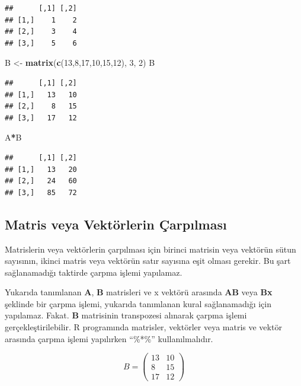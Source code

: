 \documentclass[
]{book}
\newenvironment{Shaded}{\begin{snugshade}}{\end{snugshade}}
\newcommand{\DecValTok}[1]{\textcolor[rgb]{0.00,0.00,0.81}{#1}}
\newcommand{\FunctionTok}[1]{\textcolor[rgb]{0.13,0.29,0.53}{\textbf{#1}}}
\newcommand{\NormalTok}[1]{#1}
\newcommand{\OtherTok}[1]{\textcolor[rgb]{0.56,0.35,0.01}{#1}}
\newcommand{\SpecialCharTok}[1]{\textcolor[rgb]{0.81,0.36,0.00}{\textbf{#1}}}
\begin{document}
\begin{verbatim}
##      [,1] [,2]
## [1,]    1    2
## [2,]    3    4
## [3,]    5    6
\end{verbatim}

\begin{Shaded}
\begin{Highlighting}[]
\NormalTok{ B }\OtherTok{\textless{}{-}} \FunctionTok{matrix}\NormalTok{(}\FunctionTok{c}\NormalTok{(}\DecValTok{13}\NormalTok{,}\DecValTok{8}\NormalTok{,}\DecValTok{17}\NormalTok{,}\DecValTok{10}\NormalTok{,}\DecValTok{15}\NormalTok{,}\DecValTok{12}\NormalTok{), }\DecValTok{3}\NormalTok{, }\DecValTok{2}\NormalTok{) }
\NormalTok{ B }
\end{Highlighting}
\end{Shaded}

\begin{verbatim}
##      [,1] [,2]
## [1,]   13   10
## [2,]    8   15
## [3,]   17   12
\end{verbatim}

\begin{Shaded}
\begin{Highlighting}[]
\NormalTok{ A}\SpecialCharTok{*}\NormalTok{B }
\end{Highlighting}
\end{Shaded}

\begin{verbatim}
##      [,1] [,2]
## [1,]   13   20
## [2,]   24   60
## [3,]   85   72
\end{verbatim}

\subsection{Matris veya Vektörlerin Çarpılması}\label{matris-veya-vektuxf6rlerin-uxe7arpux131lmasux131}

Matrislerin veya vektörlerin çarpılması için birinci matrisin veya vektörün sütun sayısının, ikinci matris veya vektörün satır sayısına eşit olması gerekir. Bu şart sağlanamadığı taktirde çarpma işlemi yapılamaz.

Yukarıda tanımlanan \textbf{A}, \textbf{B} matrisleri ve x vektörü arasında \textbf{AB} veya \textbf{Bx} şeklinde bir çarpma işlemi, yukarıda tanımlanan kural sağlanamadığı için yapılamaz. Fakat. \textbf{B} matrisinin transpozesi alınarak çarpma işlemi gerçekleştirilebilir. R programında matrisler, vektörler veya matris ve vektör arasında çarpma işlemi yapılırken ``\%*\%'' kullanılmalıdır.

\[B=
\begin{pmatrix}
 13 & 10 \\
 8 & 15 \\
 17 & 12
\end{pmatrix}\]
\end{document}
